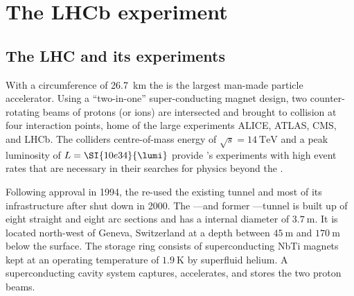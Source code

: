 
\chapter{The \acs*{LHCb} experiment}
\label{ch:lhcb_experiment}

\section{The \acs*{LHC} and its experiments}
\label{ch:lhcb_experiment:lhc}

With a circumference of \SI{26.7}{\kilo\metre} the \LHC is the largest man-made
particle accelerator. Using a \enquote{two-in-one} super-conducting magnet
design, two counter-rotating beams of protons (or ions) are intersected and
brought to collision at four interaction points, home of the large \LHC
experiments \acs*{ALICE}, \acs*{ATLAS}, \acs*{CMS}, and \acs*{LHCb}. The
colliders centre-of-mass energy of $\sqrt{s}=\SI{14}{\TeV}$ and a peak
luminosity of $L=\SI{10e34}{\lumi}$ provide \LHC's experiments with high event
rates that are necessary in their searches for physics beyond the \SM.

Following approval in 1994, the \LHC re-used the existing \LEP tunnel and most
of its infrastructure after \LEP shut down in 2000. The \LHC---and former
\LEP---tunnel is built up of eight straight and eight arc sections and has a
internal diameter of $\SI{3.7}{\metre}$. It is located north-west of Geneva,
Switzerland at a depth between $\SI{45}{\metre}$ and $\SI{170}{\metre}$ below
the surface. The storage ring consists of superconducting NbTi magnets kept at
an operating temperature of $\SI{1.9}{\kelvin}$ by superfluid helium. A
superconducting \RF cavity system captures, accelerates, and stores the two
proton beams.

